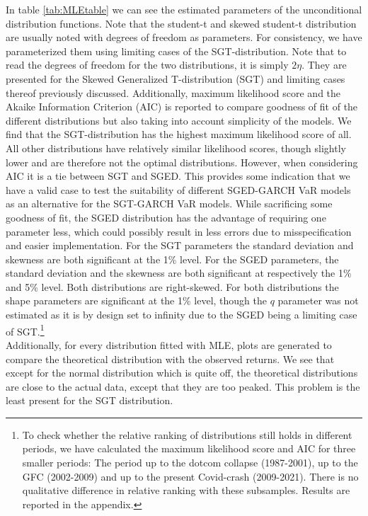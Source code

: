 \documentclass[a4paper, nobind]{templates/ociamthesis}
\begin{document}
In table \ref{tab:MLEtable} we can see the estimated parameters of the unconditional distribution functions. Note that the student-t and skewed student-t distribution are usually noted with degrees of freedom as parameters. For consistency, we have parameterized them using limiting cases of the SGT-distribution. Note that to read the degrees of freedom for the two distributions, it is simply \(2\eta\). They are presented for the Skewed Generalized T-distribution (SGT) and limiting cases thereof previously discussed. Additionally, maximum likelihood score and the Akaike Information Criterion (AIC) is reported to compare goodness of fit of the different distributions but also taking into account simplicity of the models. We find that the SGT-distribution has the highest maximum likelihood score of all. All other distributions have relatively similar likelihood scores, though slightly lower and are therefore not the optimal distributions. However, when considering AIC it is a tie between SGT and SGED. This provides some indication that we have a valid case to test the suitability of different SGED-GARCH VaR models as an alternative for the SGT-GARCH VaR models. While sacrificing some goodness of fit, the SGED distribution has the advantage of requiring one parameter less, which could possibly result in less errors due to misspecification and easier implementation. For the SGT parameters the standard deviation and skewness are both significant at the 1\% level. For the SGED parameters, the standard deviation and the skewness are both significant at respectively the 1\% and 5\% level. Both distributions are right-skewed. For both distributions the shape parameters are significant at the 1\% level, though the \(q\) parameter was not estimated as it is by design set to infinity due to the SGED being a limiting case of SGT.\footnote{To check whether the relative ranking of distributions still holds in different periods, we have calculated the maximum likelihood score and AIC for three smaller periods: The period up to the dotcom collapse (1987-2001), up to the GFC (2002-2009) and up to the present Covid-crash (2009-2021). There is no qualitative difference in relative ranking with these subsamples. Results are reported in the appendix.} ~\\

\noindent Additionally, for every distribution fitted with MLE, plots are generated to compare the theoretical distribution with the observed returns. We see that except for the normal distribution which is quite off, the theoretical distributions are close to the actual data, except that they are too peaked. This problem is the least present for the SGT distribution.
\end{document}
